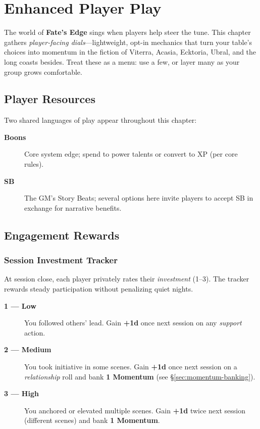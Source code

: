 \chapter{Enhanced Player Play}
\label{ch:enhanced-play}

The world of \textbf{Fate's Edge} sings when players help steer the tune. This chapter gathers \emph{player-facing dials}—lightweight, opt-in mechanics that turn your table's choices into momentum in the fiction of Viterra, Acasia, Ecktoria, Ubral, and the long coasts besides. Treat these as a menu: use a few, or layer many as your group grows comfortable.

\section{Player Resources}

Two shared languages of play appear throughout this chapter:
\begin{description}
  \item[\textbf{Boons}] Core system edge; spend to power talents or convert to XP (per core rules).
  \item[\textbf{SB}] The GM's Story Beats; several options here invite players to accept SB in exchange for narrative benefits.
\end{description}

\section{Engagement Rewards}

\subsection{Session Investment Tracker}
At session close, each player privately rates their \emph{investment} (1–3). The tracker rewards steady participation without penalizing quiet nights.

\begin{description}
  \item[\textbf{1 — Low}] You followed others' lead. Gain \textbf{+1d} once next session on any \emph{support} action.
  \item[\textbf{2 — Medium}] You took initiative in some scenes. Gain \textbf{+1d} once next session on a \emph{relationship} roll and bank \textbf{1 Momentum} (see \S\ref{sec:momentum-banking}).%
  \item[\textbf{3 — High}] You anchored or elevated multiple scenes. Gain \textbf{+1d} twice next session (different scenes) and bank \textbf{1 Momentum}.%
\end{description}

